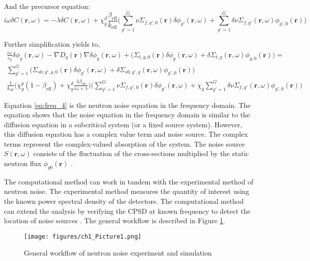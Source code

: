 And the precursor equation:
\begin{equation}
        i \omega \delta C(\textbf{r}, \omega) = - \lambda \delta C(\textbf{r}, \omega) + \chi^d_g \frac{\beta_{\text{eff}}}{k_{\text{eff}}}\biggl(\sum_{g' = 1}^{G} \nu \Sigma_{f,g',0}(\textbf{r}) \delta \phi_{g'}(\textbf{r}, \omega) + \sum_{g' = 1}^{G} \delta \nu \Sigma_{f,g'}(\textbf{r}, \omega) \phi_{g',0}(\textbf{r}) \biggr)
        \label{eq:freq_2}
\end{equation}

Further simplification yields to,
\begin{equation}
        \begin{aligned}
                \frac{i \omega}{v_g} \delta \phi_g (\textbf{r}, \omega) - \nabla D_g(\textbf{r}) \nabla \delta \phi_g(\textbf{r}, \omega) + \biggl(\Sigma_{t,g,0}(\textbf{r}) \delta \phi_g(\textbf{r}, \omega) + \delta \Sigma_{t,g}(\textbf{r}, \omega) \phi_{g,0}(\textbf{r}) \biggr) = \\
                \sum_{g' = 1}^{G} \biggl(\Sigma_{s0,g',g,0}(\textbf{r}) \delta \phi_{g'}(\textbf{r}, \omega) + \delta \Sigma_{s0,g',g}(\textbf{r}, \omega) \phi_{g',0}(\textbf{r}) \biggr)\\
                \frac{1}{k_{\text{eff}}} \biggl( \chi^p_g (1-\beta_{\text{eff}}) + \chi^d_g \frac{\lambda \beta_{\text{eff}}}{i \omega + \lambda} \biggr)  \biggl(\sum_{g' = 1}^{G} \nu \Sigma_{f,g',0}(\textbf{r}) \delta \phi_{g'}(\textbf{r}, \omega) + \chi_g \sum_{g' = 1}^{G} \delta \nu \Sigma_{f,g'}(\textbf{r}, \omega) \phi_{g',0}(\textbf{r}) \biggr)
        \end{aligned}
        \label{eq:freq_4}
\end{equation}

Equation \ref{eq:freq_4} is the neutron noise equation in the frequency domain. The equation shows that the noise equation in the frequency domain is similar to the diffusion equation in a subcritical system (or a fixed source system). However, this diffusion equation has a complex value term and noise source. The complex terms represent the complex-valued absorption of the system. The noise source  $S (\textbf{r}, \omega)$ consists of the fluctuation of the cross-sections multiplied by the static neutron flux $\phi_{g0} (\textbf{r})$ \cite{pazsitDynamicAdjointGreen2015}. 

The computational method can work in tandem with the experimental method of neutron noise. The experimental method measures the quantity of interest using the known power spectral density of the detectors. The computational method can extend the analysis by verifying the CPSD at known frequency to detect the location of noise sources \cite{hursinModelingNoiseExperiments2023}. The general workflow is described in Figure \ref{fig:flow_diagram}.
\begin{figure}[h]
        \centering
        \texttt{[image: figures/ch1\_Picture1.png]}
        \caption{General workflow of neutron noise experiment and simulation}
        \label{fig:flow_diagram}
\end{figure}

